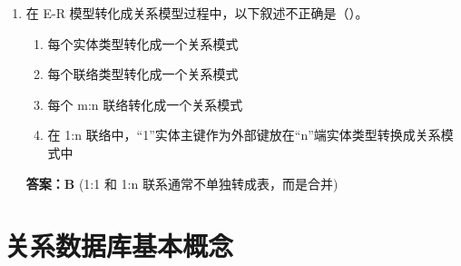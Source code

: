 \documentclass[12pt, a4paper]{article}
\begin{document}
\begin{enumerate}[label=\arabic*.]
    \item 在 E-R 模型转化成关系模型过程中，以下叙述不正确是（\quad）。
    \begin{enumerate}
        \item 每个实体类型转化成一个关系模式
        \item 每个联络类型转化成一个关系模式
        \item 每个 m:n 联络转化成一个关系模式
        \item 在 1:n 联络中，“1”实体主键作为外部键放在“n”端实体类型转换成关系模式中
    \end{enumerate}
    \textbf{答案：B} (1:1 和 1:n 联系通常不单独转成表，而是合并)
\end{enumerate}

\section{关系数据库基本概念}
\end{document}
